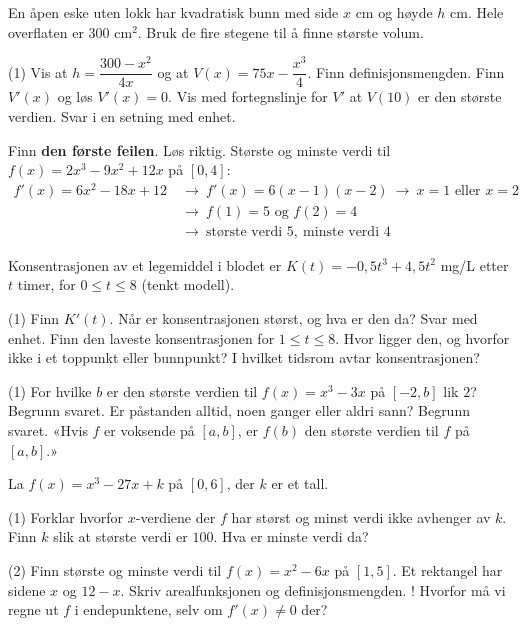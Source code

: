 En åpen eske uten lokk har kvadratisk bunn med side $x$ cm og høyde $h$ cm. Hele overflaten er $300$ cm$^2$. Bruk de fire stegene til å finne største volum.
\begin{tasks}(1)
  \task Vis at $h = \dfrac{300 - x^2}{4x}$ og at $V(x) = 75x - \dfrac{x^3}{4}$. Finn definisjonsmengden.
  \task Finn $V'(x)$ og løs $V'(x) = 0$.
  \task Vis med fortegnslinje for $V'$ at $V(10)$ er den største verdien. Svar i en setning med enhet.
\end{tasks}

Finn \textbf{den første feilen}. Løs riktig.
Største og minste verdi til $f(x) = 2x^3 - 9x^2 + 12x$ på $[0, 4]$:
\[ \begin{aligned}
f'(x) = 6x^2 - 18x + 12 \ &\longrightarrow\ f'(x) = 6(x - 1)(x - 2) \ \longrightarrow\ x = 1 \text{ eller } x = 2\\
&\longrightarrow\ f(1) = 5 \text{ og } f(2) = 4\\
&\longrightarrow\ \text{største verdi } 5,\ \text{minste verdi } 4
\end{aligned} \]

Konsentrasjonen av et legemiddel i blodet er $K(t) = -0,5t^3 + 4,5t^2$ mg/L etter $t$ timer, for $0 \le t \le 8$ (tenkt modell).
\begin{tasks}(1)
  \task Finn $K'(t)$. Når er konsentrasjonen størst, og hva er den da? Svar med enhet.
  \task Finn den laveste konsentrasjonen for $1 \le t \le 8$. Hvor ligger den, og hvorfor ikke i et toppunkt eller bunnpunkt?
  \task I hvilket tidsrom avtar konsentrasjonen?
\end{tasks}


\begin{tasks}(1)
  \task For hvilke $b$ er den største verdien til $f(x) = x^3 - 3x$ på $[-2, b]$ lik $2$? Begrunn svaret.
  \task Er påstanden alltid, noen ganger eller aldri sann? Begrunn svaret. «Hvis $f$ er voksende på $[a, b]$, er $f(b)$ den største verdien til $f$ på $[a, b]$.»
\end{tasks}

La $f(x) = x^3 - 27x + k$ på $[0, 6]$, der $k$ er et tall.
\begin{tasks}(1)
  \task Forklar hvorfor $x$-verdiene der $f$ har størst og minst verdi ikke avhenger av $k$.
  \task Finn $k$ slik at største verdi er $100$. Hva er minste verdi da?
\end{tasks}

\begin{sjekk}
\begin{tasks}(2)
  \task Finn største og minste verdi til $f(x) = x^2 - 6x$ på $[1, 5]$.
  \task Et rektangel har sidene $x$ og $12 - x$. Skriv arealfunksjonen og definisjonsmengden.
  \task! Hvorfor må vi regne ut $f$ i endepunktene, selv om $f'(x) \ne 0$ der?
\end{tasks}
\end{sjekk}
